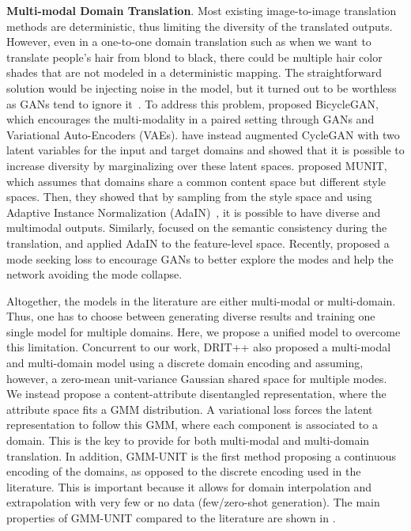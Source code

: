 \documentclass[runningheads]{llncs}
\begin{document}
\noindent \textbf{Multi-modal Domain Translation}. Most existing image-to-image translation methods are deterministic, thus limiting the diversity of the translated outputs. However, even in a one-to-one domain translation such as when we want to translate people's hair from blond to black, there could be multiple hair color shades that are not modeled in a deterministic mapping.
The straightforward solution would be injecting noise in the model, but it turned out to be worthless as GANs tend to ignore it~\cite{isola2017image,mathieu2015deep,zhu2017toward}. 
To address this problem, \cite{zhu2017toward} proposed BicycleGAN, which encourages the multi-modality in a paired setting through GANs and Variational Auto-Encoders (VAEs). \cite{almahairi2018augmented} have instead augmented CycleGAN with two latent variables for the input and target domains and showed that it is possible to increase diversity by marginalizing over these latent spaces.
\cite{huang2018multimodal} proposed MUNIT, which assumes that domains share a common content space but different style spaces. Then, they showed that by sampling from the style space and using Adaptive Instance Normalization (AdaIN)~\cite{huang2017arbitrary}, it is possible to have diverse and multimodal outputs. Similarly, \cite{ma2018exemplar} focused on the semantic consistency during the translation, and applied AdaIN to the feature-level space. Recently, \cite{MSGAN} proposed a mode seeking loss to encourage GANs to better explore the modes and help the network avoiding the mode collapse.

Altogether, the models in the literature are either multi-modal or multi-domain. Thus, one has to choose between generating diverse results and training one single model for multiple domains. Here, we propose a unified model to overcome this limitation. Concurrent to our work, DRIT++ \cite{lee2019drit++} also proposed a multi-modal and multi-domain model using a discrete domain encoding and assuming, however, a zero-mean unit-variance Gaussian shared space for multiple modes. We instead propose a content-attribute disentangled representation, where the attribute space fits a GMM distribution. A variational loss forces the latent representation to follow this GMM, where each component is associated to a domain. This is the key to provide for both multi-modal and multi-domain translation. In addition, GMM-UNIT is the first method proposing a continuous encoding of the domains, as opposed to the discrete encoding used in the literature. This is important because it allows for domain interpolation and extrapolation with very few or no data (few/zero-shot generation). The main properties of GMM-UNIT compared to the literature are shown in .
\end{document}
